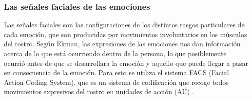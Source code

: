\subsubsection*{Las señales faciales de las emociones}
Las señales faciales son las configuraciones de los distintos rasgos particulares de cada emoción, que son producidas por movimientos involuntarios en los músculos del rostro. Según Ekman, las expresiones de las emociones nos dan información acerca de lo que está ocurriendo dentro de la persona, lo que posiblemente ocurrió antes de que se desarrollara la emoción y aquello que puede llegar a pasar en consecuencia de la emoción. Para esto se utiliza el sistema FACS (Facial Action Coding System), que es un sistema de codificación que recoge todos movimientos expresivos del rostro en unidades de acción (AU) \cite{ekman2017rostro}.


